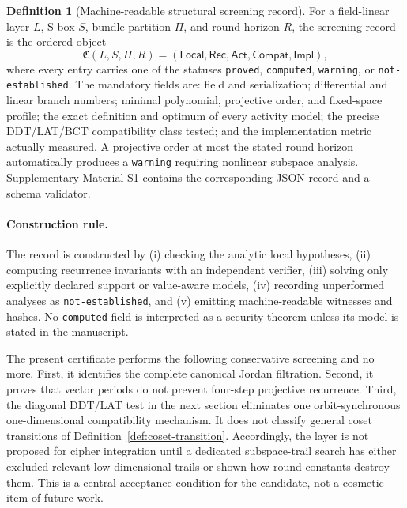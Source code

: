 \documentclass[10pt,reqno]{amsart}
\theoremstyle{plain}
\theoremstyle{remark}\newtheorem{remark}[theorem]{Remark}
\theoremstyle{definition}\newtheorem{definition}[theorem]{Definition}
\begin{document}
\begin{definition}[Machine-readable structural screening record]\label{def:screening-record}
For a field-linear layer \(L\), S-box \(S\), bundle partition \(\Pi\), and round horizon \(R\), the screening record is the ordered object
\[
\mathfrak C(L,S,\Pi,R)=(\mathsf{Local},\mathsf{Rec},\mathsf{Act},\mathsf{Compat},\mathsf{Impl}),
\]
where every entry carries one of the statuses \texttt{proved}, \texttt{computed}, \texttt{warning}, or \texttt{not-established}.  The mandatory fields are: field and serialization; differential and linear branch numbers; minimal polynomial, projective order, and fixed-space profile; the exact definition and optimum of every activity model; the precise DDT/LAT/BCT compatibility class tested; and the implementation metric actually measured.  A projective order at most the stated round horizon automatically produces a \texttt{warning} requiring nonlinear subspace analysis.  Supplementary Material S1 contains the corresponding JSON record and a schema validator.
\end{definition}

\paragraph{Construction rule.} The record is constructed by (i) checking the analytic local hypotheses, (ii) computing recurrence invariants with an independent verifier, (iii) solving only explicitly declared support or value-aware models, (iv) recording unperformed analyses as \texttt{not-established}, and (v) emitting machine-readable witnesses and hashes.  No \texttt{computed} field is interpreted as a security theorem unless its model is stated in the manuscript.


The present certificate performs the following conservative screening and no more. First, it identifies the complete canonical Jordan filtration. Second, it proves that vector periods do not prevent four-step projective recurrence. Third, the diagonal DDT/LAT test in the next section eliminates one orbit-synchronous one-dimensional compatibility mechanism. It does not classify general coset transitions of Definition~\ref{def:coset-transition}. Accordingly, the layer is not proposed for cipher integration until a dedicated subspace-trail search has either excluded relevant low-dimensional trails or shown how round constants destroy them. This is a central acceptance condition for the candidate, not a cosmetic item of future work.
\end{document}
